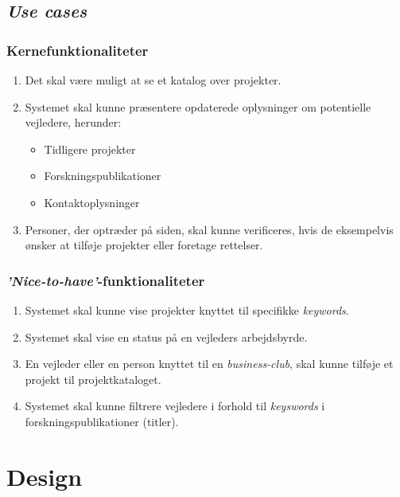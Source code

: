 \documentclass[12pt]{article}
\begin{document}
\subsection*{\textit{Use cases}}

\subsubsection{Kernefunktionaliteter}
\label{sec:corefuncs}
\begin{enumerate}
	\item Det skal være muligt at se et katalog over projekter.
	\item Systemet skal kunne præsentere opdaterede oplysninger om potentielle vejledere, herunder:
	\begin{itemize}
		\item Tidligere projekter
		\item Forskningspublikationer
		\item Kontaktoplysninger
	\end{itemize}
	\item Personer, der optræder på siden, skal kunne verificeres, hvis de eksempelvis ønsker at tilføje projekter eller foretage rettelser.
\end{enumerate}

\subsubsection*{\textit{'Nice-to-have'}-funktionaliteter}
\label{sec:nicefuncs}
\begin{enumerate}
  \item Systemet skal kunne vise projekter knyttet til specifikke \textit{keywords}.

  \item Systemet skal vise en status på en vejleders arbejdsbyrde.
  \item En vejleder eller en person knyttet til en \textit{business-club}, skal kunne tilføje et projekt til projektkataloget.

	\item Systemet skal kunne filtrere vejledere i forhold til \textit{keyswords} i forskningspublikationer (titler).
\end{enumerate}


\section{Design}
\label{sec:design}
\end{document}
